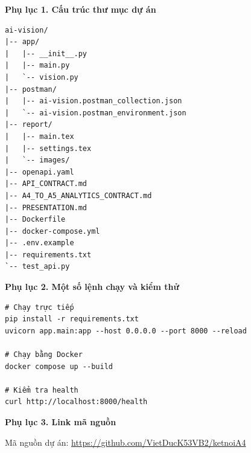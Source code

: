 \appendix
{}

\noindent\textbf{Phụ lục 1. Cấu trúc thư mục dự án}

\begin{verbatim}
ai-vision/
|-- app/
|   |-- __init__.py
|   |-- main.py
|   `-- vision.py
|-- postman/
|   |-- ai-vision.postman_collection.json
|   `-- ai-vision.postman_environment.json
|-- report/
|   |-- main.tex
|   |-- settings.tex
|   `-- images/
|-- openapi.yaml
|-- API_CONTRACT.md
|-- A4_TO_A5_ANALYTICS_CONTRACT.md
|-- PRESENTATION.md
|-- Dockerfile
|-- docker-compose.yml
|-- .env.example
|-- requirements.txt
`-- test_api.py
\end{verbatim}

\noindent\textbf{Phụ lục 2. Một số lệnh chạy và kiểm thử}

\begin{verbatim}
# Chạy trực tiếp
pip install -r requirements.txt
uvicorn app.main:app --host 0.0.0.0 --port 8000 --reload

# Chạy bằng Docker
docker compose up --build

# Kiểm tra health
curl http://localhost:8000/health
\end{verbatim}

\noindent\textbf{Phụ lục 3. Link mã nguồn}

Mã nguồn dự án: \url{https://github.com/VietDucK53VB2/ketnoiA4}
